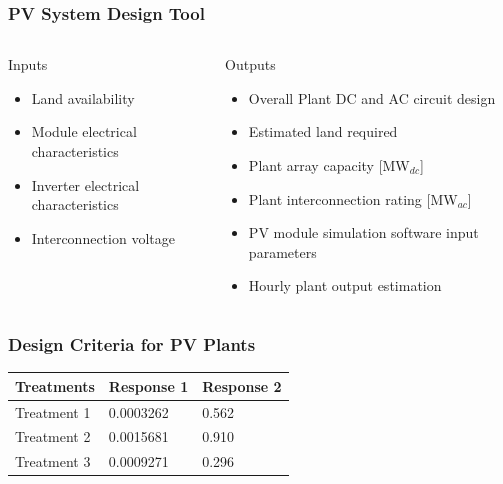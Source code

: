 \documentclass[aspectratio=169]{beamer}
\begin{document}
\begin{frame}
  \frametitle{PV System Design Tool}
  \begin{columns}[t]
    \begin{block}{Inputs}
      \begin{itemize}
      \item Land availability
      \item Module electrical characteristics
      \item Inverter electrical characteristics
      \item Interconnection voltage
      \end{itemize}
    \end{block}

    \begin{block}{Outputs}
      \begin{itemize}
      \item Overall Plant DC and AC circuit design
      \item Estimated land required
      \item Plant array capacity [MW$_{dc}$]
      \item Plant interconnection rating [MW$_{ac}$]
      \item PV module simulation software input parameters
      \item Hourly plant output estimation
      \end{itemize}
    \end{block}
  \end{columns}
\end{frame}

\begin{frame}
\frametitle{Design Criteria for PV Plants}
\begin{table}
\begin{tabular}{l l l}
\toprule
\textbf{Treatments} & \textbf{Response 1} & \textbf{Response 2}\\
\midrule
Treatment 1 & 0.0003262 & 0.562 \\
Treatment 2 & 0.0015681 & 0.910 \\
Treatment 3 & 0.0009271 & 0.296 \\
\bottomrule
\end{tabular}
\end{table}
\end{frame}
\end{document}
